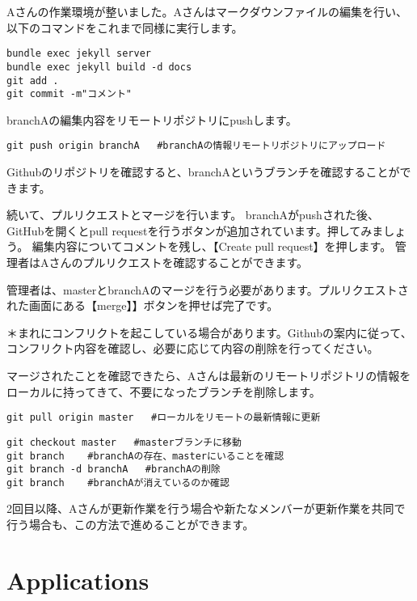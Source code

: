 \documentclass[
]{book}
\begin{document}
Aさんの作業環境が整いました。Aさんはマークダウンファイルの編集を行い、以下のコマンドをこれまで同様に実行します。

\begin{verbatim}
bundle exec jekyll server
bundle exec jekyll build -d docs
git add .
git commit -m"コメント"
\end{verbatim}

branchAの編集内容をリモートリポジトリにpushします。

\begin{verbatim}
git push origin branchA   #branchAの情報リモートリポジトリにアップロード
\end{verbatim}

Githubのリポジトリを確認すると、branchAというブランチを確認することができます。

続いて、プルリクエストとマージを行います。
branchAがpushされた後、GitHubを開くとpull requestを行うボタンが追加されています。押してみましょう。
編集内容についてコメントを残し、【Create pull request】を押します。
管理者はAさんのプルリクエストを確認することができます。

管理者は、masterとbranchAのマージを行う必要があります。プルリクエストされた画面にある【merge】】ボタンを押せば完了です。

＊まれにコンフリクトを起こしている場合があります。Githubの案内に従って、コンフリクト内容を確認し、必要に応じて内容の削除を行ってください。

マージされたことを確認できたら、Aさんは最新のリモートリポジトリの情報をローカルに持ってきて、不要になったブランチを削除します。

\begin{verbatim}
git pull origin master   #ローカルをリモートの最新情報に更新
\end{verbatim}

\begin{verbatim}
git checkout master   #masterブランチに移動
git branch    #branchAの存在、masterにいることを確認
git branch -d branchA   #branchAの削除
git branch    #branchAが消えているのか確認
\end{verbatim}

2回目以降、Aさんが更新作業を行う場合や新たなメンバーが更新作業を共同で行う場合も、この方法で進めることができます。

\hypertarget{applications}{%
\chapter{Applications}\label{applications}}
\end{document}
